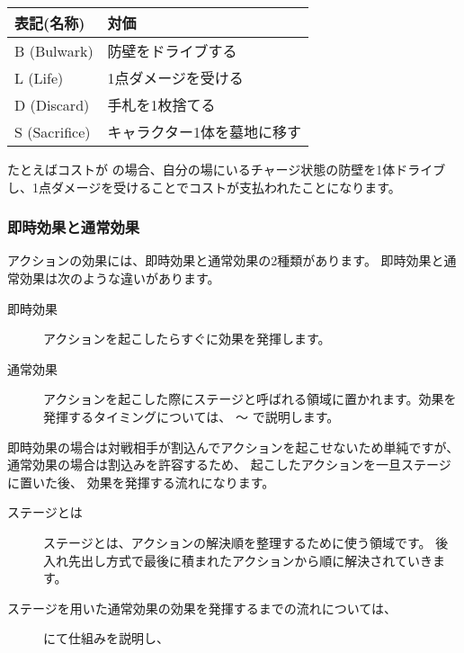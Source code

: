 \documentclass[letterpaper,10pt,dvipdfmx]{sphinxmanual}
\begin{document}
\begin{savenotes}\sphinxattablestart
\centering
{}
\sphinxthecaptionisattop
{}\label{\detokenize{common/03-action:id33}}\label{\detokenize{common/03-action:table-cost}}
\sphinxaftertopcaption
\begin{tabulary}{\linewidth}[t]{|T|T|}
\hline
\sphinxstyletheadfamily 
表記(名称)
&\sphinxstyletheadfamily 
対価
\\
\hline
B (Bulwark)
&
防壁をドライブする
\\
\hline
L (Life)
&
1点ダメージを受ける
\\
\hline
D (Discard)
&
手札を1枚捨てる
\\
\hline
S (Sacrifice)
&
キャラクター1体を墓地に移す
\\
\hline
\end{tabulary}
\par
\sphinxattableend\end{savenotes}

たとえばコストが  の場合、自分の場にいるチャージ状態の防壁を1体ドライブし、1点ダメージを受けることでコストが支払われたことになります。


\subsubsection{即時効果と通常効果}
\label{\detokenize{common/03-action:id4}}
アクションの効果には、即時効果と通常効果の2種類があります。
即時効果と通常効果は次のような違いがあります。
\begin{description}
\item[{即時効果}] \leavevmode
アクションを起こしたらすぐに効果を発揮します。

\item[{通常効果}] \leavevmode
アクションを起こした際にステージと呼ばれる領域に置かれます。効果を発揮するタイミングについては、
{\hyperref[\detokenize{common/03-action:action-exe}]{}} 〜 {\hyperref[\detokenize{common/03-action:action-flow}]{}} で説明します。

\end{description}

即時効果の場合は対戦相手が割込んでアクションを起こせないため単純ですが、
通常効果の場合は割込みを許容するため、
起こしたアクションを一旦ステージに置いた後、
効果を発揮する流れになります。
\begin{description}
\item[{ステージとは}] \leavevmode
ステージとは、アクションの解決順を整理するために使う領域です。
後入れ先出し方式で最後に積まれたアクションから順に解決されていきます。

\item[{ステージを用いた通常効果の効果を発揮するまでの流れについては、}] \leavevmode
{\hyperref[\detokenize{common/03-action:action-chance}]{}} にて仕組みを説明し、

\end{description}
\end{document}
